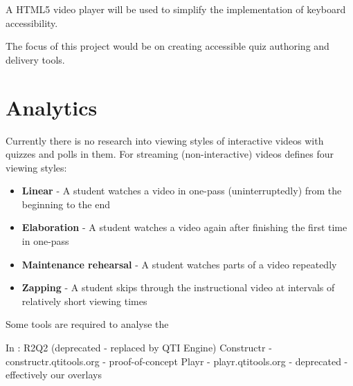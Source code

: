 A HTML5 video player will be used to simplify the implementation of keyboard accessibility.

The focus of this project would be on creating accessible quiz authoring and delivery tools.

\section{Analytics}
\label{Section:Analytics}
Currently there is no research into viewing styles of interactive videos with quizzes and polls in them. For streaming (non-interactive) videos \cite{DeBoer} defines four viewing styles:
\begin{itemize}
\item \textbf{Linear} - A student watches a video in one-pass (uninterruptedly) from the beginning to the end
\item \textbf{Elaboration} - A student watches a video again after finishing the first time in one-pass
\item \textbf{Maintenance rehearsal} - A student watches parts of a video repeatedly
\item \textbf{Zapping} - A student skips through the instructional video at intervals of relatively short viewing times
\end{itemize}

Some tools are required to analyse the

\ifnote
In \cite{eps265979}:
R2Q2 (deprecated - replaced by QTI Engine)
Constructr - constructr.qtitools.org - proof-of-concept
Playr - playr.qtitools.org - deprecated - effectively our overlays
\fi